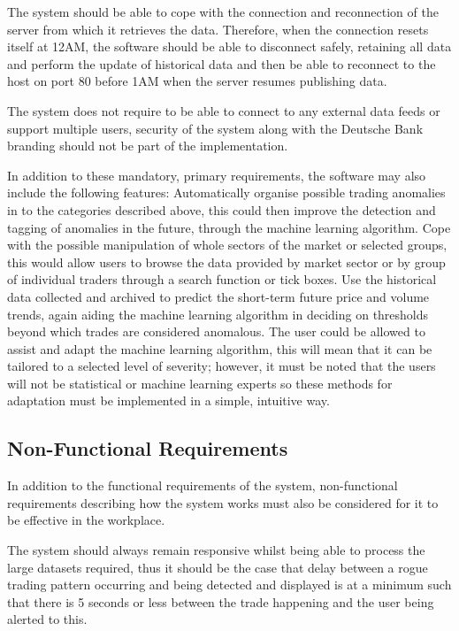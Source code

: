 \documentclass[10pt, oneside, a4paper]{article}
\begin{document}
The system should be able to cope with the connection and reconnection of the server from which it retrieves the
data. Therefore, when the connection resets itself at 12AM, the software should be able to disconnect safely,
retaining all data and perform the update of historical data and then be able to reconnect to the host on port 80
before 1AM when the server resumes publishing data.

The system does not require to be able to connect to any external data feeds or support multiple users, security
of the system along with the Deutsche Bank branding should not be part of the implementation.

In addition to these mandatory, primary requirements, the software may also include the following features:
Automatically organise possible trading anomalies in to the categories described above, this could then improve
the detection and tagging of anomalies in the future, through the machine learning algorithm. Cope with the
possible manipulation of whole sectors of the market or selected groups, this would allow users to browse the
data provided by market sector or by group of individual traders through a search function or tick boxes. Use
the historical data collected and archived to predict the short-term future price and volume trends, again
aiding the machine learning algorithm in deciding on thresholds beyond which trades are considered anomalous.
The user could be allowed to assist and adapt the machine learning algorithm, this will mean that it can be
tailored to a selected level of severity; however, it must be noted that the users will not be statistical or
machine learning experts so these methods for adaptation must be implemented in a simple, intuitive way.

\subsection{Non-Functional Requirements}
In addition to the functional requirements of the system, non-functional requirements describing how the system
works must also be considered for it to be effective in the workplace.

The system should always remain responsive whilst being able to process the large datasets required, thus it
should be the case that delay between a rogue trading pattern occurring and being detected and displayed is at
a minimum such that there is 5 seconds or less between the trade happening and the user being alerted to this.
\end{document}

